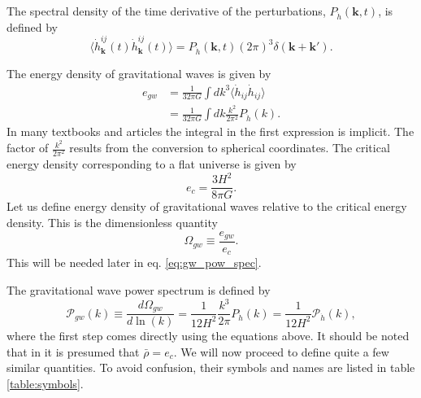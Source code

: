 The spectral density of the time derivative of the perturbations, $P_{\dot{h}}(\bm{k},t)$, is defined by
\cite[eq. 3.4]{hindmarsh_gw_pt_2019}
\begin{equation}
\langle \dot{h}_{\bm{k}}^{ij}(t) \dot{h}_{\bm{k}}^{ij}(t) \rangle = P_{\dot{h}}(\bm{k},t) (2\pi)^3 \delta (\bm{k} + \bm{k}').
\label{eq:hbracket}
\end{equation}

The energy density of gravitational waves is given by
\cites[eq. 3.3]{hindmarsh_gw_pt_2019}[eq. 1.135, 7.193]{maggiore_gw_2008}
\begin{align}
e_{gw}
&= \frac{1}{32 \pi G} \int dk^3 \langle \dot{h}_{ij} \dot{h}_{ij} \rangle \\
&= \frac{1}{32 \pi G} \int dk \frac{k^2}{2 \pi^2} P_{\dot{h}}(k).
\end{align}
In many textbooks and articles the integral in the first expression is implicit.
The factor of $\frac{k^2}{2\pi^2}$ results from the conversion to spherical coordinates.
The critical energy density corresponding to a flat universe is given by
\cite[eq. 7.196]{maggiore_gw_2008}
\begin{equation}
e_c = \frac{3 H^2}{8 \pi G}.
\label{eq:e_crit}
\end{equation}
Let us define energy density of gravitational waves relative to the critical energy density.
This is the dimensionless quantity
\begin{equation}
\Omega_{gw} \equiv \frac{e_{gw}}{e_c}.
\label{eq:omega_gw}
\end{equation}
This will be needed later in eq. \eqref{eq:gw_pow_spec}.

The gravitational wave power spectrum is defined by
\cite[eq. 3.45]{hindmarsh_gw_pt_2019}
\begin{equation}
\mathcal{P}_{gw}(k)
\equiv \frac{d \Omega_{gw}}{d \ln (k)}
= \frac{1}{12 H^2} \frac{k^3}{2\pi} P_{\dot{h}}(k)
= \frac{1}{12 H^2} \mathcal{P}_{\dot{h}}(k),
\label{eq:gw_pow_spec}
\end{equation}
where the first step comes directly using the equations above.
It should be noted that in \cite[eq. 3.6]{hindmarsh_gw_pt_2019} it is presumed that $\bar{\rho}=e_c$.
We will now proceed to define quite a few similar quantities.
To avoid confusion, their symbols and names are listed in table \ref{table:symbols}.

